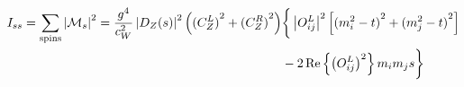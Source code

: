 \documentclass[english,notitlepage]{article}
\begin{document}
    \begin{subequations}
        \begin{align} \nonumber
            I_{ss} = \sum_\text{spins} \left|\mathcal{M}_s\right|^2 = \frac{g^4}{c_W^2} \left|D_Z(s)\right|^2 \left({(C_Z^L)}^2+{(C_Z^R)}^2\right) &\bigg\{ \left|O_{ij}^L\right|^2 \left[ {(m_i^2-t)}^2 + {(m_j^2-t)}^2 \right] \\
            &- 2\operatorname{Re}\left\{\left(O_{ij}^L\right)^2\right\} m_i m_j s \bigg\}
        \end{align}
    \end{subequations}
\end{document}

